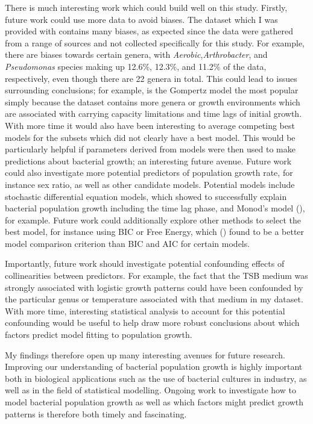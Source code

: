 \documentclass[11pt]{article}
\begin{document}
	There is much interesting work which could build well on this study. Firstly, future work could use more data to avoid biases. The dataset which I was provided with contains many biases, as expected since the data were gathered from a range of sources and not collected specifically for this study. For example, there are biases towards certain genera, with \textit{Aerobic},\textit{Arthrobacter}, and \textit{Pseudomonas} species making up 12.6\%, 12.3\%, and 11.2\% of the data, respectively, even though there are 22 genera in total. This could lead to issues surrounding conclusions; for example, is the Gompertz model the most popular simply because the dataset contains more genera or growth environments which are associated with carrying capacity limitations and time lags of initial growth. With more time it would also have been interesting to average competing best models for the subsets which did not clearly have a best model. This would be particularly helpful if parameters derived from models were then used to make predictions about bacterial growth; an interesting future avenue. Future work could also investigate more potential predictors of population growth rate, for instance sex ratio, as well as other candidate models. Potential models include stochastic differential equation models, which \cite{alonso2014modeling} showed to successfully explain bacterial population growth including the time lag phase, and Monod's model (\cite{lobry1992monod}), for example. Future work could additionally explore other methods to select the best model, for instance using BIC or Free Energy, which (\cite{penny2012comparing}) found to be a better model comparison criterion than BIC and AIC for certain models.
	
	
	Importantly, future work should investigate potential confounding effects of collinearities between predictors. For example, the fact that the TSB medium was strongly associated with logistic growth patterns could have been confounded by the particular genus or temperature associated with that medium in my dataset. With more time, interesting statistical analysis to account for this potential confounding would be useful to help draw more robust conclusions about which factors predict model fitting to population growth.
	
	My findings therefore open up many interesting avenues for future research. Improving our understanding of bacterial population growth is highly important both in biological applications such as the use of bacterial cultures in industry, as well as in the field of statistical modelling. Ongoing work to investigate how to model bacterial population growth as well as which factors might predict growth patterns is therefore both timely and fascinating.
	
\end{document}
